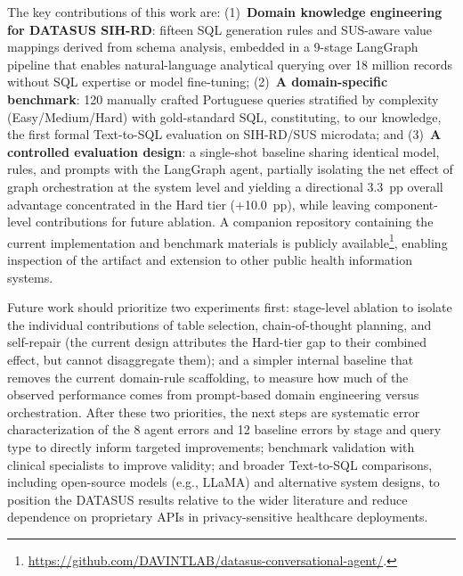 \documentclass[conference]{IEEEtran}
\begin{document}
The key contributions of this work are: (1)~\textbf{Domain knowledge engineering for DATASUS SIH-RD}: fifteen SQL generation rules and SUS-aware value mappings derived from schema analysis, embedded in a 9-stage LangGraph pipeline that enables natural-language analytical querying over 18 million records without SQL expertise or model fine-tuning; (2)~\textbf{A domain-specific benchmark}: 120 manually crafted Portuguese queries stratified by complexity (Easy/Medium/Hard) with gold-standard SQL, constituting, to our knowledge, the first formal Text-to-SQL evaluation on SIH-RD/SUS microdata; and (3)~\textbf{A controlled evaluation design}: a single-shot baseline sharing identical model, rules, and prompts with the LangGraph agent, partially isolating the net effect of graph orchestration at the system level and yielding a directional 3.3~pp overall advantage concentrated in the Hard tier ($+$10.0~pp), while leaving component-level contributions for future ablation. A companion repository containing the current implementation and benchmark materials is publicly available\footnote{\url{https://github.com/DAVINTLAB/datasus-conversational-agent/}.}, enabling inspection of the artifact and extension to other public health information systems.

Future work should prioritize two experiments first: stage-level ablation to isolate the individual contributions of table selection, chain-of-thought planning, and self-repair (the current design attributes the Hard-tier gap to their combined effect, but cannot disaggregate them); and a simpler internal baseline that removes the current domain-rule scaffolding, to measure how much of the observed performance comes from prompt-based domain engineering versus orchestration. After these two priorities, the next steps are systematic error characterization of the 8 agent errors and 12 baseline errors by stage and query type to directly inform targeted improvements; benchmark validation with clinical specialists to improve validity; and broader Text-to-SQL comparisons, including open-source models (e.g., LLaMA) and alternative system designs, to position the DATASUS results relative to the wider literature and reduce dependence on proprietary APIs in privacy-sensitive healthcare deployments.







\end{document}
